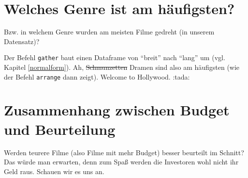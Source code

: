 \documentclass[12pt,ngerman,]{book}
\makeatletter
\newenvironment{Shaded}{\begin{snugshade}}{\end{snugshade}}
\newcommand{\KeywordTok}[1]{\textcolor[rgb]{0.13,0.29,0.53}{\textbf{#1}}}
\newcommand{\StringTok}[1]{\textcolor[rgb]{0.31,0.60,0.02}{#1}}
\newcommand{\CommentTok}[1]{\textcolor[rgb]{0.56,0.35,0.01}{\textit{#1}}}
\newcommand{\OperatorTok}[1]{\textcolor[rgb]{0.81,0.36,0.00}{\textbf{#1}}}
\newcommand{\NormalTok}[1]{#1}
\newenvironment{kframe}{%
\medskip{}
\setlength{\fboxsep}{.8em}
 \def\at@end@of@kframe{}%
 \ifinner\ifhmode%
  \def\at@end@of@kframe{\end{minipage}}%
  \begin{minipage}{\columnwidth}%
 \fi\fi%
 \def\FrameCommand##1{\hskip\@totalleftmargin \hskip-\fboxsep
 \colorbox{shadecolor}{##1}\hskip-\fboxsep
     \hskip-\linewidth \hskip-\@totalleftmargin \hskip\columnwidth}%
 \MakeFramed {\advance\hsize-\width
   \@totalleftmargin\z@ \linewidth\hsize
   \@setminipage}}%
 {\par\unskip\endMakeFramed%
 \at@end@of@kframe}
\renewenvironment{Shaded}{\begin{kframe}}{\end{kframe}}
\theoremstyle{definition}
\theoremstyle{definition}
\theoremstyle{remark}
\makeatother
\begin{document}
\section{Welches Genre ist am
häufigsten?}\label{welches-genre-ist-am-haufigsten}

Bzw. in welchem Genre wurden am meisten Filme gedreht (in unserem
Datensatz)?

\begin{Shaded}
\end{Shaded}

Der Befehl \texttt{gather} baut einen Dataframe von ``breit'' nach
``lang'' um (vgl. Kapitel \ref{normalform}). Ah, \sout{Schmunzetten}
Dramen sind also am häufigsten (wie der Befehl \texttt{arrange} dann
zeigt). Welcome to Hollywood. :tada:

\section{Zusammenhang zwischen Budget und
Beurteilung}\label{zusammenhang-zwischen-budget-und-beurteilung}

Werden teurere Filme (also Filme mit mehr Budget) besser beurteilt im
Schnitt? Das würde man erwarten, denn zum Spaß werden die Investoren
wohl nicht ihr Geld raus. Schauen wir es uns an.

\begin{Shaded}
\end{Shaded}
\end{document}
